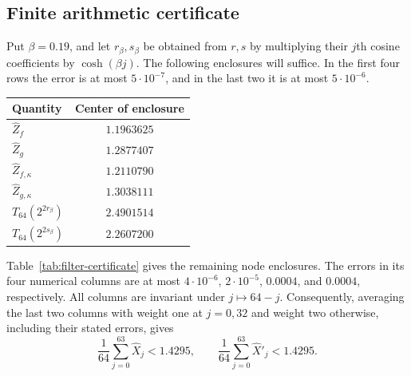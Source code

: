 \subsection{Finite arithmetic certificate}

Put $\beta=0.19$, and let $r_\beta,s_\beta$ be obtained from $r,s$ by
multiplying their $j$th cosine coefficients by $\cosh(\beta j)$.
The following enclosures will suffice.  In the first four rows the
error is at most $5\cdot10^{-7}$, and in the last two it is at most
$5\cdot10^{-6}$.
\begin{center}
\begin{tabular}{lc}
\toprule
Quantity & Center of enclosure\\
\midrule
$\widehat Z_f$ & $1.1963625$\\
$\widehat Z_g$ & $1.2877407$\\
$\widehat Z_{f,\kappa}$ & $1.2110790$\\
$\widehat Z_{g,\kappa}$ & $1.3038111$\\
$T_{64}(2^{2r_\beta})$ & $2.4901514$\\
$T_{64}(2^{2s_\beta})$ & $2.2607200$\\
\bottomrule
\end{tabular}
\end{center}

Table~\ref{tab:filter-certificate} gives the remaining node enclosures.
The errors in its four numerical columns are at most $4\cdot10^{-6}$,
$2\cdot10^{-5}$, $0.0004$, and $0.0004$, respectively.  All columns
are invariant under $j\mapsto64-j$.  Consequently, averaging the last
two columns with weight one at $j=0,32$ and weight two otherwise,
including their stated errors, gives
\begin{equation}\label{eq:hatted-average-bound}
 \frac1{64}\sum_{j=0}^{63}\widehat X_j<1.4295,
 \qquad
 \frac1{64}\sum_{j=0}^{63}\widehat X'_j<1.4295.
\end{equation}

